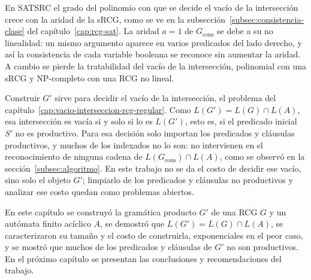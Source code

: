 \documentclass{report}
\theoremstyle{definition}
\theoremstyle{plain}
\begin{document}
En SATSRC el grado del polinomio con que se decide el vacío de la
intersección crece con la aridad de la sRCG, como se ve en la
subsección~\ref{subsec:consistencia-clase} del
capítulo~\ref{cap:rcg-sat}. La aridad $a = 1$ de $G_{\mathrm{cons}}$ se
debe a su no linealidad: un mismo argumento aparece en varios predicados
del lado derecho, y así la consistencia de cada variable booleana se
reconoce sin aumentar la aridad. A cambio se pierde la tratabilidad del
vacío de la intersección, polinomial con una sRCG y NP-completo con una
RCG no lineal.

Construir $G'$ sirve para decidir el vacío de la intersección, el
problema del capítulo~\ref{cap:vacio-interseccion-rcg-regular}. Como
$L(G') = L(G) \cap L(A)$, esa intersección es vacía si y solo si lo es
$L(G')$, esto es, si el predicado inicial $S'$ no es productivo. Para esa
decisión solo importan los predicados y cláusulas productivos, y muchos
de los indexados no lo son: no intervienen en el reconocimiento de
ninguna cadena de $L(G_{\mathrm{cons}}) \cap L(A)$, como se observó en la
sección~\ref{subsec:algoritmo}. En este trabajo no se da el costo de
decidir ese vacío, sino solo el objeto $G'$; limpiarlo de los predicados
y cláusulas no productivos y analizar ese costo quedan como problemas
abiertos.

En este capítulo se construyó la gramática producto $G'$ de una RCG $G$
y un autómata finito acíclico $A$, se demostró que
$L(G') = L(G) \cap L(A)$, se caracterizaron su tamaño y el costo de
construirla, exponenciales en el peor caso, y se mostró que muchos de
los predicados y cláusulas de $G'$ no son productivos. En el próximo
capítulo se presentan las conclusiones y recomendaciones del trabajo.



\end{document}
